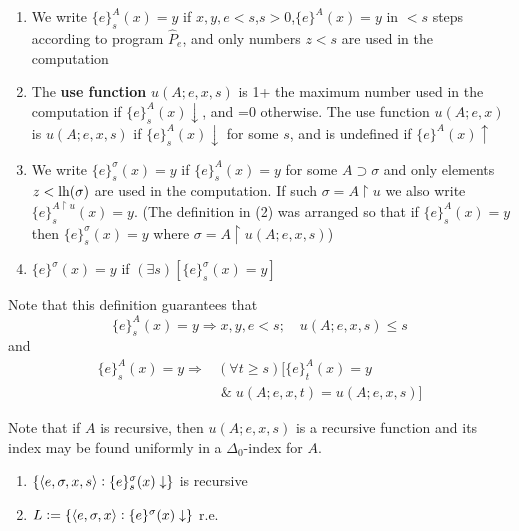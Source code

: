 \documentclass[11pt]{article}
\begin{document}
\begin{definition}[]
\begin{enumerate}
\item We write \(\{e\}_s^A(x)=y\) if \(x,y,e<s\),\(s>0\),\(\{e\}^A(x)=y\) in
\(<s\) steps according to program \(\widehat{P}_e\), and only numbers
\(z<s\) are used in the computation
\item The \textbf{use function} \(u(A;e,x,s)\) is 1+ the maximum number used in the
computation if \(\{e\}^A_s(x)\downarrow\), and =0 otherwise. The use
function \(u(A;e,x)\) is \(u(A;e,x,s)\) if \(\{e\}_s^A(x)\downarrow\) for
some \(s\), and is undefined if \(\{e\}^A(x)\uparrow\)
\item We write \(\{e\}_s^\sigma(x)=y\) if \(\{e\}_s^A(x)=y\) for some
\(A\supset\sigma\) and only elements \(z<\operatorname{lh}(\sigma)\) are used in the
computation. If such \(\sigma=A\restriction u\) we also write
\(\{e\}_s^{A\restriction u}(x)=y\). (The definition in (2) was arranged
so that if \(\{e\}_s^A(x)=y\) then \(\{e\}_s^\sigma(x)=y\) where
\(\sigma=A\restriction u(A;e,x,s)\))
\item \(\{e\}^\sigma(x)=y\) if \((\exists s)[\{e\}_s^\sigma(x)=y]\)
\end{enumerate}
\end{definition}

Note that this definition guarantees that
\begin{equation}
\{e\}_s^A(x)=y\Longrightarrow x,y,e<s;\quad u(A;e,x,s)\le s\label{eq3.1.1}
\end{equation}
and
\begin{align}
\{e\}_s^A(x)=y\Longrightarrow&(\forall t\ge s)[\{e\}_t^A(x)=y\\
&\;\&\;u(A;e,x,t)=u(A;e,x,s)]\nonumber\label{eq3.1.2}
\end{align}

Note that if \(A\) is recursive, then \(u(A;e,x,s)\) is a recursive function
and its index may be found uniformly in a \(\Delta_0\)-index for \(A\).

\begin{theorem}
\label{thm3.1.8}
\begin{enumerate}
\item \(\{\langle e,\sigma,x,s\rangle:\{e\}_s^\sigma(x)\downarrow\}\) is recursive
\item \(L:=\{\langle e,\sigma,x\rangle:\{e\}^\sigma(x)\downarrow\}\) r.e.
\end{enumerate}
\end{theorem}
\end{document}
